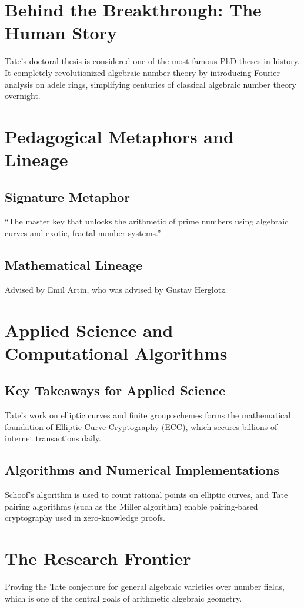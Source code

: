\section{Behind the Breakthrough: The Human Story}
Tate's doctoral thesis is considered one of the most famous PhD theses in history. It completely revolutionized algebraic number theory by introducing Fourier analysis on adele rings, simplifying centuries of classical algebraic number theory overnight.

\section{Pedagogical Metaphors and Lineage}
\subsection{Signature Metaphor}
``The master key that unlocks the arithmetic of prime numbers using algebraic curves and exotic, fractal number systems.''

\subsection{Mathematical Lineage}
Advised by Emil Artin, who was advised by Gustav Herglotz.

\section{Applied Science and Computational Algorithms}
\subsection{Key Takeaways for Applied Science}
Tate's work on elliptic curves and finite group schemes forms the mathematical foundation of Elliptic Curve Cryptography (ECC), which secures billions of internet transactions daily.

\subsection{Algorithms and Numerical Implementations}
Schoof's algorithm is used to count rational points on elliptic curves, and Tate pairing algorithms (such as the Miller algorithm) enable pairing-based cryptography used in zero-knowledge proofs.

\section{The Research Frontier}
Proving the Tate conjecture for general algebraic varieties over number fields, which is one of the central goals of arithmetic algebraic geometry.

